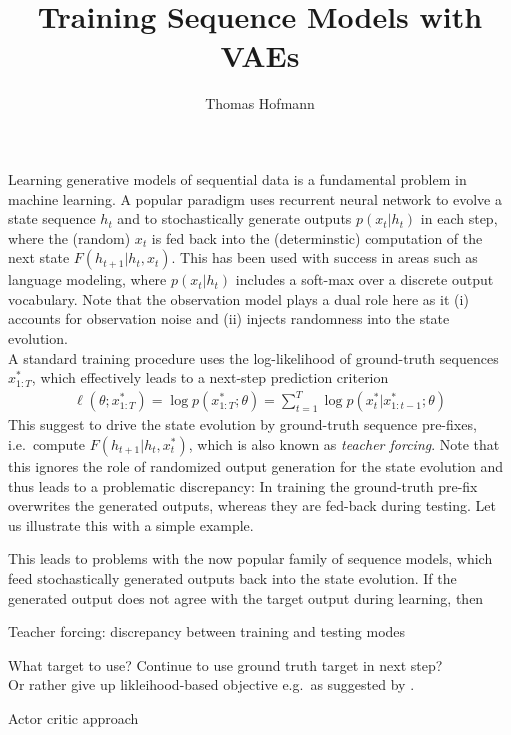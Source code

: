 \documentclass{article}
\author{Thomas Hofmann}
\title{Training Sequence Models with VAEs}
\begin{document}
\maketitle

Learning generative models of sequential data is a fundamental problem in machine learning. A popular paradigm uses  recurrent neural network to evolve a state sequence $h_{t}$ and to stochastically generate outputs $p(x_t|h_t)$ in each step, where the (random) $x_t$ is fed back into the  (determinstic) computation of the next state $F(h_{t+1}|h_t,x_t)$. This has been used with success in areas such as language modeling, where $p(x_t|h_t)$ includes a soft-max over a discrete output vocabulary. Note that the observation model plays a dual role here as it (i)  accounts for observation noise and (ii) injects randomness into the state evolution.\\

A standard training procedure uses the log-likelihood of ground-truth sequences $x^*_{1:T}$, which effectively leads to a next-step prediction criterion 
\begin{align}
\ell(\theta; x^*_{1:T}) = \log p(x_{1:T}^*; \theta) = \sum_{t=1}^T \log p(x^*_t | x^*_{1:t-1}; \theta) 
\end{align}
This suggest to drive the state evolution by ground-truth sequence pre-fixes, i.e.~compute $F(h_{t+1}|h_t, x_t^*)$, which is also known as \textit{teacher forcing}. Note that this ignores the role of randomized output generation for the state evolution and thus leads to a problematic discrepancy: In training the ground-truth pre-fix overwrites the generated outputs, whereas they are fed-back during testing. Let us illustrate this with a simple example. 

\newpage


This leads to problems with the now popular family of sequence models, which feed stochastically generated outputs back into the state evolution. If the generated output does not agree with the target output during learning, then  

\newpage
 

Teacher forcing: discrepancy between training and testing modes

What target to use? Continue to use ground truth target in next step? \cite{bengio2015scheduled}\\
Or rather give up likleihood-based objective e.g.~as suggested by \cite{ranzato2015sequence}.

Actor critic approach \cite{bahdanau2016actor}



\end{document}
